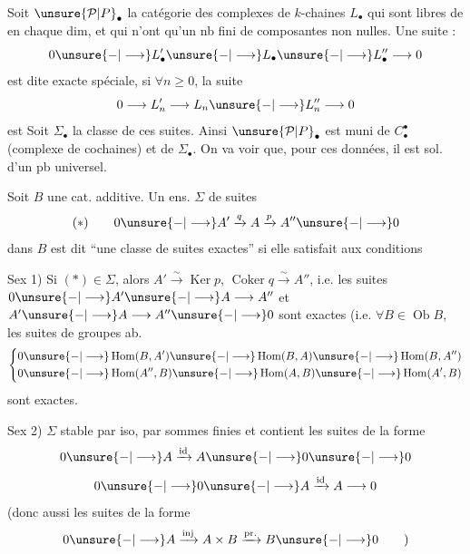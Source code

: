 Soit $\unsure{\mathcal P|P}_\bullet$ la catégorie des complexes de $k$-chaines $L_\bullet$
qui sont libres de  en chaque dim,
et qui n'ont qu'un nb fini de composantes
non nulles. Une suite :
\[
0\unsure{-|\longrightarrow}L'_\bullet\unsure{-|\longrightarrow}L_\bullet\unsure{-|\longrightarrow}L''_\bullet\longrightarrow0
\]
 est dite exacte spéciale, si $\forall n\geqslant0$, la suite
\[
0\longrightarrow L'_n\longrightarrow L_n\unsure{-|\longrightarrow}L''_n\longrightarrow0
\]
est  Soit $\Sigma_\bullet$ la
classe de ces suites. Ainsi $\unsure{\mathcal P|P}_\bullet$ est muni de
$C_\bullet^\bullet$ (complexe de cochaines) et de $\Sigma_\bullet$. On va
voir que, pour ces données, il est sol. d'un
pb universel.
\margin{!}

Soit  $B$ une cat. additive. Un ens. $\Sigma$ de
suites
\[
(*)\qquad 0\unsure{-|\longrightarrow}A'\xrightarrow{q}A\xrightarrow{p}A''\unsure{-|\longrightarrow}0
\]
dans $B$ est dit ``une classe de suites exactes''
si elle satisfait aux conditions

Sex 1) Si $(*)\in\Sigma$, alors $A'\xrightarrow{\sim}\operatorname{Ker}p$, $\operatorname{Coker}q\xrightarrow{\sim}A''$,
i.e. les suites $0\unsure{-|\longrightarrow}A'\unsure{-|\longrightarrow}A\longrightarrow A''$ et 
$A'\unsure{-|\longrightarrow}A\longrightarrow A''\unsure{-|\longrightarrow}0$
sont exactes (i.e. $\forall B\in\operatorname{Ob}B$, les suites de groupes
ab.
\[
\left\{\begin{aligned}
0&\unsure{-|\longrightarrow}\operatorname{Hom}(B,A')\unsure{-|\longrightarrow}\operatorname{Hom}(B,A)\unsure{-|\longrightarrow}\operatorname{Hom}(B,A'')\\
0&\unsure{-|\longrightarrow}\operatorname{Hom}(A'',B)\unsure{-|\longrightarrow}\operatorname{Hom}(A,B)\unsure{-|\longrightarrow}\operatorname{Hom}(A',B)
\end{aligned}\right.
\]
 sont exactes.

Sex 2) $\Sigma$ stable par iso, par sommes finies
et contient les suites de la forme
\[
0\unsure{-|\longrightarrow}A\xrightarrow{\mathrm{id}}A\unsure{-|\longrightarrow}0\unsure{-|\longrightarrow}0
\]
\[
0\unsure{-|\longrightarrow}0\unsure{-|\longrightarrow}A\xrightarrow{\mathrm{id}}A\longrightarrow0
\]
(donc aussi les suites de la forme
\[
0\unsure{-|\longrightarrow}A\xrightarrow{\mathrm{inj}}A\times B\xrightarrow{\mathrm{pr.}}B\unsure{-|\longrightarrow}0\qquad)
\]


